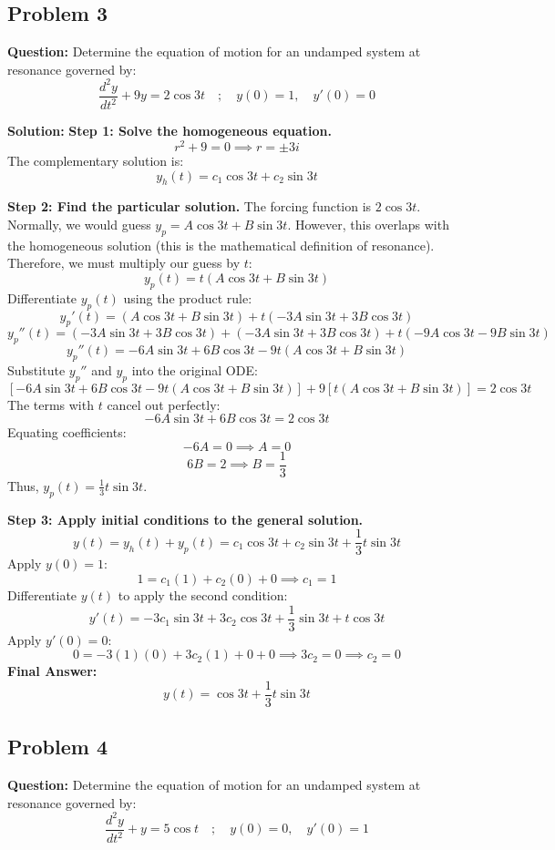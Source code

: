 \documentclass[11pt]{article}
\begin{document}
\subsection{Problem 3}
\textbf{Question:} Determine the equation of motion for an undamped system at resonance governed by:
\[ \frac{d^2y}{dt^2} + 9y = 2 \cos 3t \quad ; \quad y(0) = 1, \quad y'(0) = 0 \]

\textbf{Solution:}
\textbf{Step 1: Solve the homogeneous equation.}
\[ r^2 + 9 = 0 \implies r = \pm 3i \]
The complementary solution is:
\[ y_h(t) = c_1 \cos 3t + c_2 \sin 3t \]

\textbf{Step 2: Find the particular solution.}
The forcing function is $2 \cos 3t$. Normally, we would guess $y_p = A \cos 3t + B \sin 3t$. However, this overlaps with the homogeneous solution (this is the mathematical definition of resonance). Therefore, we must multiply our guess by $t$:
\[ y_p(t) = t(A \cos 3t + B \sin 3t) \]
Differentiate $y_p(t)$ using the product rule:
\[ y_p'(t) = (A \cos 3t + B \sin 3t) + t(-3A \sin 3t + 3B \cos 3t) \]
\[ y_p''(t) = (-3A \sin 3t + 3B \cos 3t) + (-3A \sin 3t + 3B \cos 3t) + t(-9A \cos 3t - 9B \sin 3t) \]
\[ y_p''(t) = -6A \sin 3t + 6B \cos 3t - 9t(A \cos 3t + B \sin 3t) \]
Substitute $y_p''$ and $y_p$ into the original ODE:
\[ [-6A \sin 3t + 6B \cos 3t - 9t(A \cos 3t + B \sin 3t)] + 9[t(A \cos 3t + B \sin 3t)] = 2 \cos 3t \]
The terms with $t$ cancel out perfectly:
\[ -6A \sin 3t + 6B \cos 3t = 2 \cos 3t \]
Equating coefficients:
\[ -6A = 0 \implies A = 0 \]
\[ 6B = 2 \implies B = \frac{1}{3} \]
Thus, $y_p(t) = \frac{1}{3} t \sin 3t$.

\textbf{Step 3: Apply initial conditions to the general solution.}
\[ y(t) = y_h(t) + y_p(t) = c_1 \cos 3t + c_2 \sin 3t + \frac{1}{3} t \sin 3t \]
Apply $y(0) = 1$:
\[ 1 = c_1(1) + c_2(0) + 0 \implies c_1 = 1 \]
Differentiate $y(t)$ to apply the second condition:
\[ y'(t) = -3c_1 \sin 3t + 3c_2 \cos 3t + \frac{1}{3} \sin 3t + t \cos 3t \]
Apply $y'(0) = 0$:
\[ 0 = -3(1)(0) + 3c_2(1) + 0 + 0 \implies 3c_2 = 0 \implies c_2 = 0 \]
\textbf{Final Answer:}
\[ y(t) = \cos 3t + \frac{1}{3} t \sin 3t \]

\subsection{Problem 4}
\textbf{Question:} Determine the equation of motion for an undamped system at resonance governed by:
\[ \frac{d^2y}{dt^2} + y = 5 \cos t \quad ; \quad y(0) = 0, \quad y'(0) = 1 \]
\end{document}
